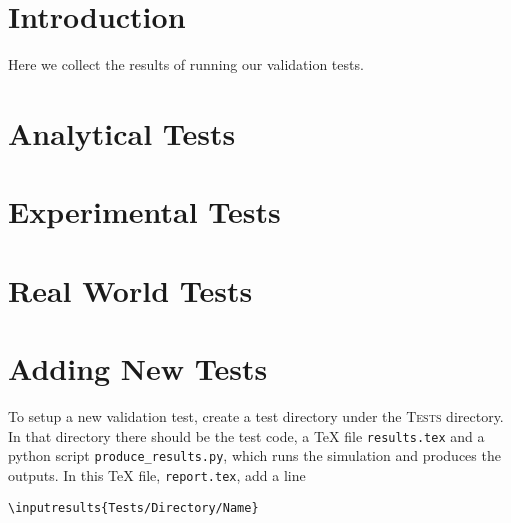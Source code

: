 \documentclass[11pt,a4paper]{report}
\begin{document}
 

\chapter{Introduction}

Here we collect the results of running our validation tests. 



\chapter{Analytical Tests}



\chapter{Experimental Tests}


\chapter{Real World Tests}


\appendix
\chapter{Adding New Tests}


To setup a new validation test, create a test directory under the
\textsc{Tests} directory. In that directory there should be the test code, a
\TeX{} file \texttt{results.tex} and a python script
\texttt{produce\_results.py}, which runs the simulation and produces the
outputs. In this \TeX{} file, \texttt{report.tex}, add a line
\begin{verbatim}
\inputresults{Tests/Directory/Name}
\end{verbatim}
\end{document}

